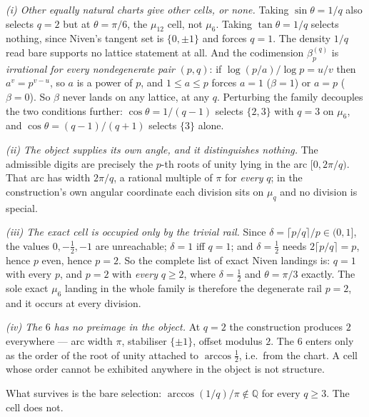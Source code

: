 \documentclass[11pt]{article}
\begin{document}
\emph{(i) Other equally natural charts give other cells, or none.}  Taking
$\sin\theta=1/q$ also selects $q=2$ but at $\theta=\pi/6$, the $\mu_{12}$ cell, not $\mu_6$.
Taking $\tan\theta=1/q$ selects nothing, since Niven's tangent set is $\{0,\pm1\}$ and forces
$q=1$.  The density $1/q$ read bare supports no lattice statement at all.  And the
codimension $\beta_p^{(q)}$ is \emph{irrational for every nondegenerate pair} $(p,q)$: if
$\log(p/a)/\log p=u/v$ then $a^{v}=p^{v-u}$, so $a$ is a power of $p$, and $1\le a\le p$
forces $a=1$ ($\beta=1$) or $a=p$ ($\beta=0$).  So $\beta$ never lands on any lattice, at any
$q$.  Perturbing the family decouples the two conditions further: $\cos\theta=1/(q-1)$ selects
$\{2,3\}$ with $q=3$ on $\mu_6$, and $\cos\theta=(q-1)/(q+1)$ selects $\{3\}$ alone.

\emph{(ii) The object supplies its own angle, and it distinguishes nothing.}  The admissible
digits are precisely the $p$-th roots of unity lying in the arc $[0,2\pi/q)$.  That arc has
width $2\pi/q$, a rational multiple of $\pi$ for \emph{every} $q$; in the construction's own
angular coordinate each division sits on $\mu_q$ and no division is special.

\emph{(iii) The exact cell is occupied only by the trivial rail.}  Since
$\delta=\lceil p/q\rceil/p\in(0,1]$, the values $0,-\tfrac12,-1$ are unreachable; $\delta=1$
iff $q=1$; and $\delta=\tfrac12$ needs $2\lceil p/q\rceil=p$, hence $p$ even, hence $p=2$.  So
the complete list of exact Niven landings is: $q=1$ with every $p$, and $p=2$ with
\emph{every} $q\ge2$, where $\delta=\tfrac12$ and $\theta=\pi/3$ exactly.  The sole exact
$\mu_6$ landing in the whole family is therefore the degenerate rail $p=2$, and it occurs at
every division.

\emph{(iv) The $6$ has no preimage in the object.}  At $q=2$ the construction produces $2$
everywhere --- arc width $\pi$, stabiliser $\{\pm1\}$, offset modulus $2$.  The $6$ enters
only as the order of the root of unity attached to $\arccos\tfrac12$, i.e.\ from the chart.
A cell whose order cannot be exhibited anywhere in the object is not structure.

What survives is the bare selection: $\arccos(1/q)/\pi\notin\mathbb Q$ for every $q\ge3$.  The
cell does not.
\end{document}
